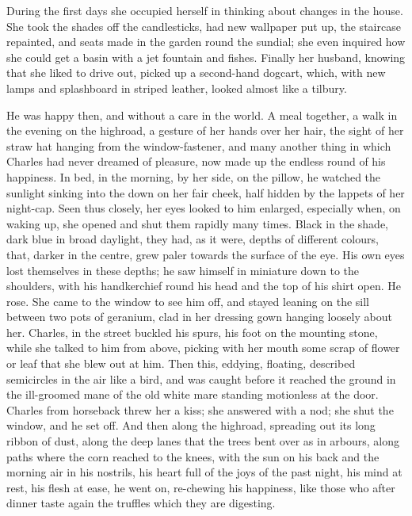 \documentclass[11pt,twocolumn]{ltugboat}
\begin{document}
During the first days she occupied herself in thinking about changes in
the house. She took the shades off the candlesticks, had new wallpaper
put up, the staircase repainted, and seats made in the garden round the
sundial; she even inquired how she could get a basin with a jet fountain
and fishes. Finally her husband, knowing that she liked to drive out,
picked up a second-hand dogcart, which, with new lamps and splashboard
in striped leather, looked almost like a tilbury.

He was happy then, and without a care in the world. A meal together,
a walk in the evening on the highroad, a gesture of her hands over her
hair, the sight of her straw hat hanging from the window-fastener, and
many another thing in which Charles had never dreamed of pleasure, now
made up the endless round of his happiness. In bed, in the morning, by
her side, on the pillow, he watched the sunlight sinking into the down
on her fair cheek, half hidden by the lappets of her night-cap. Seen
thus closely, her eyes looked to him enlarged, especially when, on
waking up, she opened and shut them rapidly many times. Black in the
shade, dark blue in broad daylight, they had, as it were, depths of
different colours, that, darker in the centre, grew paler towards the
surface of the eye. His own eyes lost themselves in these depths; he saw
himself in miniature down to the shoulders, with his handkerchief round
his head and the top of his shirt open. He rose. She came to the window
to see him off, and stayed leaning on the sill between two pots of
geranium, clad in her dressing gown hanging loosely about her. Charles,
in the street buckled his spurs, his foot on the mounting stone, while
she talked to him from above, picking with her mouth some scrap of
flower or leaf that she blew out at him. Then this, eddying, floating,
described semicircles in the air like a bird, and was caught before
it reached the ground in the ill-groomed mane of the old white mare
standing motionless at the door. Charles from horseback threw her a
kiss; she answered with a nod; she shut the window, and he set off. And
then along the highroad, spreading out its long ribbon of dust, along
the deep lanes that the trees bent over as in arbours, along paths where
the corn reached to the knees, with the sun on his back and the morning
air in his nostrils, his heart full of the joys of the past night, his
mind at rest, his flesh at ease, he went on, re-chewing his happiness,
like those who after dinner taste again the truffles which they are
digesting.
\end{document}
